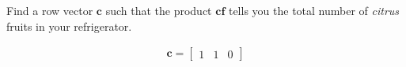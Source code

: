 Find a row vector $\boldsymbol{c}$ such that the product $\boldsymbol{cf}$ tells you the total number of \emph{citrus} fruits in your refrigerator.

\begin{solution}
\begin{align*}
    \boldsymbol{c} = \begin{bmatrix}
    1 & 1 & 0
    \end{bmatrix}
\end{align*}
\end{solution}